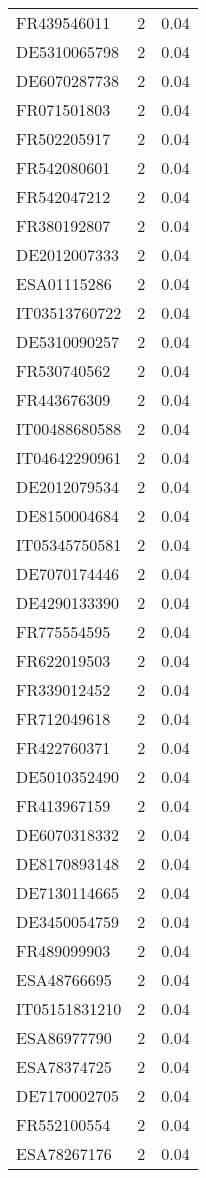 \begin{table*}[htbp]
\begin{tabular}{lrr}
FR439546011 & 2 & 0.04 \\
DE5310065798 & 2 & 0.04 \\
DE6070287738 & 2 & 0.04 \\
FR071501803 & 2 & 0.04 \\
FR502205917 & 2 & 0.04 \\
FR542080601 & 2 & 0.04 \\
FR542047212 & 2 & 0.04 \\
FR380192807 & 2 & 0.04 \\
DE2012007333 & 2 & 0.04 \\
ESA01115286 & 2 & 0.04 \\
IT03513760722 & 2 & 0.04 \\
DE5310090257 & 2 & 0.04 \\
FR530740562 & 2 & 0.04 \\
FR443676309 & 2 & 0.04 \\
IT00488680588 & 2 & 0.04 \\
IT04642290961 & 2 & 0.04 \\
DE2012079534 & 2 & 0.04 \\
DE8150004684 & 2 & 0.04 \\
IT05345750581 & 2 & 0.04 \\
DE7070174446 & 2 & 0.04 \\
DE4290133390 & 2 & 0.04 \\
FR775554595 & 2 & 0.04 \\
FR622019503 & 2 & 0.04 \\
FR339012452 & 2 & 0.04 \\
FR712049618 & 2 & 0.04 \\
FR422760371 & 2 & 0.04 \\
DE5010352490 & 2 & 0.04 \\
FR413967159 & 2 & 0.04 \\
DE6070318332 & 2 & 0.04 \\
DE8170893148 & 2 & 0.04 \\
DE7130114665 & 2 & 0.04 \\
DE3450054759 & 2 & 0.04 \\
FR489099903 & 2 & 0.04 \\
ESA48766695 & 2 & 0.04 \\
IT05151831210 & 2 & 0.04 \\
ESA86977790 & 2 & 0.04 \\
ESA78374725 & 2 & 0.04 \\
DE7170002705 & 2 & 0.04 \\
FR552100554 & 2 & 0.04 \\
ESA78267176 & 2 & 0.04 \\

\end{tabular}
\end{table*}

